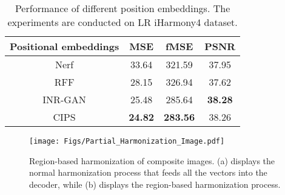 \documentclass[10pt,journal,twocolumn,twoside]{IEEEtran}
\begin{document}
\begin{table}[!ht]
\caption{Performance of different position embeddings. The experiments are conducted on LR iHarmony4 dataset.}
    \label{tab:Positonal embeddings}
\centering
\begin{tabular}{c|ccc}
\hline
Positional embeddings & MSE            & fMSE            & PSNR           \\ \hline
Nerf\cite{mildenhall2021nerf}                  & 33.64          & 321.59          & 37.95          \\
RFF\cite{tancik2020fourier}               & 28.15          & 326.94          & 37.62          \\
INR-GAN\cite{skorokhodov2021adversarial}                & 25.48          & 285.64          & \textbf{38.28} \\
CIPS\cite{anokhin2021image}                  & \textbf{24.82} & \textbf{283.56} & 38.26          \\ \hline
\end{tabular}
    
\end{table}

\begin{table}[!ht]
\caption{Performance of different 3D LUT dimensions. The experiments are conducted on LR iHarmony4 dataset.}
    \label{tab:3D LUT dimensions}
\centering
    
\end{table}

\begin{figure}[t]
  \centering
   \texttt{[image: Figs/Partial\_Harmonization\_Image.pdf]}
   \caption{Region-based harmonization of composite images. (a) displays the normal harmonization process that feeds all the vectors into the decoder, while (b) displays the region-based harmonization process.}
   \label{fig:Partial_Harmonization_Image}
\end{figure}
\end{document}
